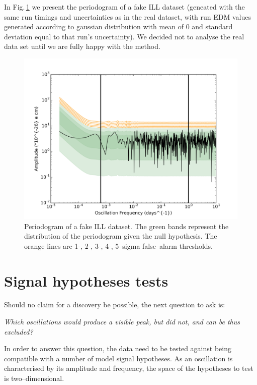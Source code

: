 In Fig.\,\ref{fig:ILL_detection} we present the periodogram of a fake ILL dataset (geneated with the same run timings and uncertainties as in the real dataset, with run EDM values generated according to gaussian distribution with mean of $0$ and standard deviation equal to that run's uncertainty). We decided not to analyse the real data set until we are fully happy with the method.

\begin{figure}[h!]
  \begin{center}
    \includegraphics[width=\columnwidth]{gfx/axions/ILL_detection_Periodogram.png}
    \caption{Periodogram of a fake ILL dataset. The green bands represent the distribution of the periodogram given the null hypothesis. The orange lines are 1-, 2-, 3-, 4-, 5--sigma false--alarm thresholds.}
    \label{fig:ILL_detection}
  \end{center}
\end{figure}





\section{Signal hypotheses tests}
Should no claim for a discovery be possible, the next question to ask is:
\begin{center}
  \emph{Which oscillations would produce a visible peak, but did not, and can be thus excluded?}
\end{center}
In order to answer this question, the data need to be tested against being compatible with a number of model signal hypotheses. As an oscillation is characterised by its amplitude and frequency, the space of the hypotheses to test is two--dimensional.

